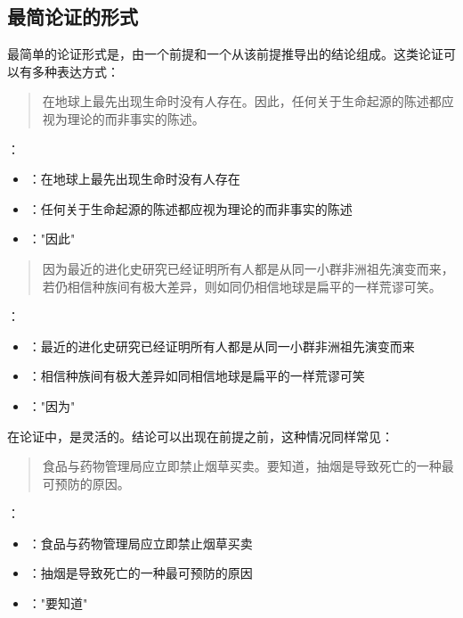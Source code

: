 \subsection{最简论证的形式}

最简单的论证形式是，由一个前提和一个从该前提推导出的结论组成。这类论证可以有多种表达方式：

\begin{examplebox}[title=分句表达的论证]
\begin{quotation}
在地球上最先出现生命时没有人存在。因此，任何关于生命起源的陈述都应视为理论的而非事实的陈述。
\end{quotation}

：
\begin{itemize}
  \item {}：在地球上最先出现生命时没有人存在
  \item {}：任何关于生命起源的陈述都应视为理论的而非事实的陈述
  \item {}："因此"
\end{itemize}
\end{examplebox}

\begin{examplebox}[title=单句表达的论证]
\begin{quotation}
因为最近的进化史研究已经证明所有人都是从同一小群非洲祖先演变而来，若仍相信种族间有极大差异，则如同仍相信地球是扁平的一样荒谬可笑。\cite{hayden2000}
\end{quotation}

：
\begin{itemize}
  \item {}：最近的进化史研究已经证明所有人都是从同一小群非洲祖先演变而来
  \item {}：相信种族间有极大差异如同相信地球是扁平的一样荒谬可笑
  \item {}："因为"
\end{itemize}
\end{examplebox}

在论证中，是灵活的。结论可以出现在前提之前，这种情况同样常见：

\begin{examplebox}[title=结论在前的论证（分句形式）]
\begin{quotation}
食品与药物管理局应立即禁止烟草买卖。要知道，抽烟是导致死亡的一种最可预防的原因。\cite{ban1992}
\end{quotation}

：
\begin{itemize}
  \item {}：食品与药物管理局应立即禁止烟草买卖
  \item {}：抽烟是导致死亡的一种最可预防的原因
  \item {}："要知道"
\end{itemize}
\end{examplebox}

